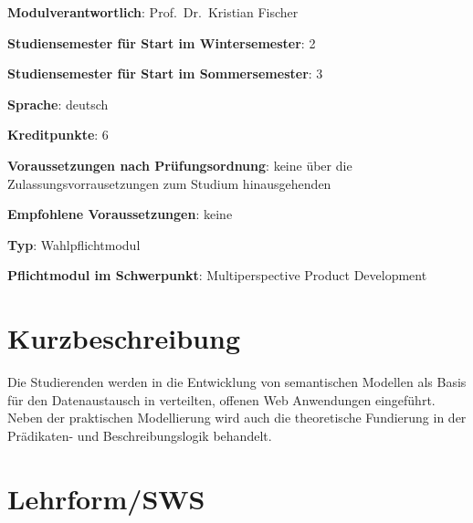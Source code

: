\begin{modulHead}
\textbf{Modulverantwortlich}: Prof.~Dr.~Kristian
Fischer
\end{modulHead}
\begin{modulHead}
\textbf{Studiensemester für
Start im Wintersemester}:
2
\end{modulHead}
\begin{modulHead}
\textbf{Studiensemester für Start
im Sommersemester}:
3
\end{modulHead}
\begin{modulHead}
\textbf{Sprache}:
deutsch
\end{modulHead}
\begin{modulHead}
\textbf{Kreditpunkte}:
6
\end{modulHead}
\begin{modulHead}
\textbf{Voraussetzungen nach
Prüfungsordnung}: keine über die Zulassungsvorrausetzungen zum Studium
hinausgehenden
\end{modulHead}
\begin{modulHead}
\textbf{Empfohlene
Voraussetzungen}: keine
\end{modulHead}
\begin{modulHead}
\textbf{Typ}:
Wahlpflichtmodul
\end{modulHead}
\begin{modulHead}
\textbf{Pflichtmodul
im Schwerpunkt}: Multiperspective Product Development
\end{modulHead}


\section*{Kurzbeschreibung\label{/mi-2017/modulbeschreibungen-master/MA_WTW_Modul_Logik-und-semantische-Modellierung}}\label{kurzbeschreibungpathlabelmi-2017modulbeschreibungen-mastermaux5fwtwux5fmodulux5flogik-und-semantische-modellierung}

Die Studierenden werden in die Entwicklung von semantischen Modellen als
Basis für den Datenaustausch in verteilten, offenen Web Anwendungen
eingeführt. Neben der praktischen Modellierung wird auch die
theoretische Fundierung in der Prädikaten- und Beschreibungslogik
behandelt.

\section*{Lehrform/SWS\label{/mi-2017/modulbeschreibungen-master/MA_WTW_Modul_Logik-und-semantische-Modellierung}}\label{lehrformswspathlabelmi-2017modulbeschreibungen-mastermaux5fwtwux5fmodulux5flogik-und-semantische-modellierung}

